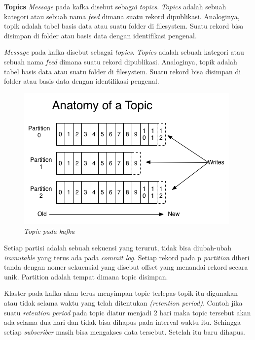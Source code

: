 \documentclass[a4paper,twoside]{article}
\begin{document}
\begin{enumerate}
		\textbf{Topics}\newline
		\textit{Message} pada kafka disebut sebagai \textit{topics}. \textit{Topics} adalah sebuah 				kategori atau sebuah nama \textit{feed} dimana suatu rekord dipublikasi. Analoginya, topik 				adalah tabel basis data atau suatu folder di filesystem. Suatu rekord bisa disimpan di 					folder atau basis data dengan identifikasi pengenal.
		
		\textit{Message} pada kafka disebut sebagai \textit{topics}. \textit{Topics} adalah sebuah 				kategori atau sebuah nama \textit{feed} dimana suatu rekord dipublikasi. Analoginya, topik 				adalah tabel basis data atau suatu folder di filesystem. Suatu rekord bisa disimpan di 					folder atau basis data dengan identifikasi pengenal.

		\begin{figure}[H] 
		\centering  
		\includegraphics[scale=0.7]{kafkatopic}  
		\caption[Gambar Topic pada Kafka]{\textit{Topic pada kafka}} 
		\label{fig:kafka-topic} 
		\end{figure}
		
		Setiap partisi adalah sebuah sekuensi yang terurut, tidak bisa diubah-ubah 								\textit{immutable} yang terus ada pada \textit{commit log}. Setiap rekord pada p						\textit{partition} diberi tanda dengan nomer sekuensial yang disebut offset yang menandai 				rekord secara unik. Partition adalah tempat dimana topic disimpan.

		Klaster pada kafka akan terus menyimpan topic terlepas topik itu digunakan atau tidak selama 		waktu yang telah ditentukan \textit{(retention period)}. Contoh jika suatu \textit{retention 		period} pada topic diatur menjadi 2 hari maka topic tersebut akan ada selama dua hari dan 				tidak bisa dihapus pada interval waktu itu. Sehingga setiap \textit{subscriber} masih bisa 				mengakses data tersebut. Setelah itu baru dihapus.


\end{enumerate}
\end{document}
